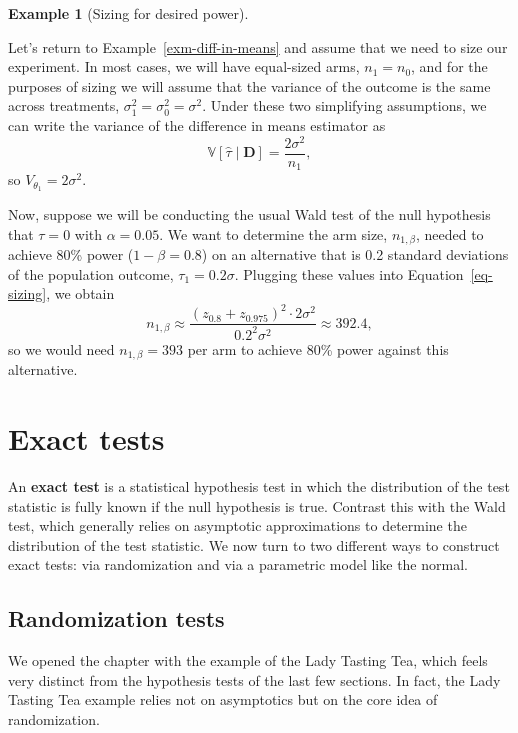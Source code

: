 \documentclass[
  13pt,
  letterpaper,
  DIV=11,
  numbers=noendperiod]{scrreprt}
\newcommand{\V}{\mathbb{V}}
\theoremstyle{plain}
\theoremstyle{plain}
\theoremstyle{definition}
\theoremstyle{definition}
\newtheorem{example}{Example}[chapter]
\theoremstyle{remark}
\begin{document}
\begin{example}[Sizing for desired
power]\protect\hypertarget{exm-sizing}{}\label{exm-sizing}

Let's return to Example~\ref{exm-diff-in-means} and assume that we need
to size our experiment. In most cases, we will have equal-sized arms,
\(n_1 = n_0\), and for the purposes of sizing we will assume that the
variance of the outcome is the same across treatments,
\(\sigma^2_1 = \sigma^2_0 = \sigma^2\). Under these two simplifying
assumptions, we can write the variance of the difference in means
estimator as \[
\V[\widehat{\tau} \mid \mathbf{D}] = \frac{2\sigma^2}{n_1},
\] so \(V_{\theta_1} = 2\sigma^2\).

Now, suppose we will be conducting the usual Wald test of the null
hypothesis that \(\tau = 0\) with \(\alpha = 0.05\). We want to
determine the arm size, \(n_{1, \beta}\), needed to achieve 80\% power
(\(1 - \beta = 0.8\)) on an alternative that is 0.2 standard deviations
of the population outcome, \(\tau_{1} = 0.2\sigma\). Plugging these
values into Equation~\ref{eq-sizing}, we obtain \[
n_{1,\beta} \approx \frac{(z_{0.8} + z_{0.975})^2 \cdot 2\sigma^2}{0.2^2 \sigma^2} \approx 392.4,
\] so we would need \(n_{1,\beta}=393\) per arm to achieve 80\% power
against this alternative.

\end{example}

\section{Exact tests}\label{sec-exact-tests}

An \textbf{exact test} is a statistical hypothesis test in which the
distribution of the test statistic is fully known if the null hypothesis
is true. Contrast this with the Wald test, which generally relies on
asymptotic approximations to determine the distribution of the test
statistic. We now turn to two different ways to construct exact tests:
via randomization and via a parametric model like the normal.

\subsection{Randomization tests}\label{sec-randomization-tests}

We opened the chapter with the example of the Lady Tasting Tea, which
feels very distinct from the hypothesis tests of the last few sections.
In fact, the Lady Tasting Tea example relies not on asymptotics but on
the core idea of randomization.
\end{document}
